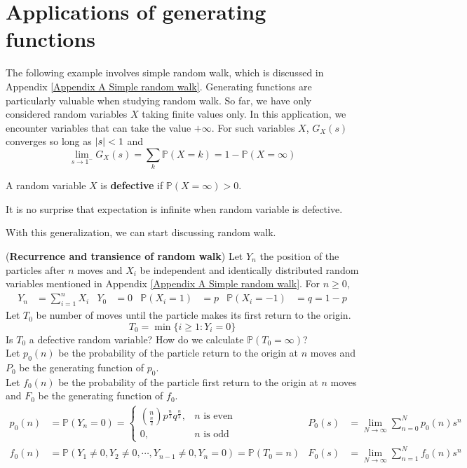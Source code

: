 \documentclass{huhtakm-template-book}
\newcommand{\prob}{\mathbb{P}}
\begin{document}
\section{Applications of generating functions}
The following example involves simple random walk, which is discussed in Appendix \ref{Appendix A Simple random walk}. Generating functions are particularly valuable when studying random walk. So far, we have only considered random variables $X$ taking finite values only. In this application, we encounter variables that can take the value $+\infty$. For such variables $X$, $G_{X}(s)$ converges so long as $\left|{s}\right|<1$ and
\begin{equation*}
	\lim_{s\to 1^{-}}G_{X}(s)=\sum_{k}\prob(X=k)=1-\prob(X=\infty)
\end{equation*}
\begin{defn}
	A random variable $X$ is \textbf{defective} if $\prob(X=\infty)>0$.
\end{defn}
\begin{rem}
	It is no surprise that expectation is infinite when random variable is defective.
\end{rem}
With this generalization, we can start discussing random walk.
\begin{eg}(\textbf{Recurrence and transience of random walk})
	\label{Chapter 7 (Example) Simple random walk recurrence and transience}
	Let $Y_{n}$ the position of the particles after $n$ moves and $X_{i}$ be independent and identically distributed random variables mentioned in Appendix \ref{Appendix A Simple random walk}. For $n\geq 0$,
	\begin{align*}
		Y_{n}&=\sum_{i=1}^{n}X_{i} & Y_{0}&=0 & \prob(X_{i}=1)&=p & \prob(X_{i}=-1)&=q=1-p
	\end{align*}
	Let $T_{0}$ be number of moves until the particle makes its first return to the origin.
	\begin{equation*}
		T_{0}=\min\{i\geq 1:Y_{i}=0\}
	\end{equation*}
	Is $T_{0}$ a defective random variable? How do we calculate $\prob(T_{0}=\infty)$?\\
	Let $p_{0}(n)$ be the probability of the particle return to the origin at $n$ moves and $P_{0}$ be the generating function of $p_{0}$.\\
	Let $f_{0}(n)$ be the probability of the particle first return to the origin at $n$ moves and $F_{0}$ be the generating function of $f_{0}$.
	\begin{align*}
		p_{0}(n)&=\prob(Y_{n}=0)=\begin{cases}
			\binom{n}{\frac{n}{2}}p^{\frac{n}{2}}q^{\frac{n}{2}}, &n\text{ is even}\\
			0, &n\text{ is odd}
		\end{cases} & P_{0}(s)&=\lim_{N\to\infty}\sum_{n=0}^{N}p_{0}(n)s^{n}\\
		f_{0}(n)&=\prob(Y_{1}\neq 0,Y_{2}\neq 0,\cdots,Y_{n-1}\neq 0,Y_{n}=0)=\prob(T_{0}=n) & F_{0}(s)&=\lim_{N\to\infty}\sum_{n=1}^{N}f_{0}(n)s^{n}
	\end{align*}
\end{eg}
\end{document}
